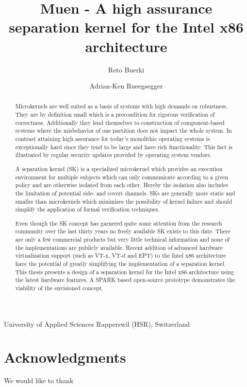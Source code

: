 \documentclass[a4paper,twoside]{report}
\title{Muen - A high assurance separation kernel for the Intel x86 architecture}
\author{Reto Buerki \and Adrian-Ken Rueegsegger}
\begin{document}


\maketitle

University of Applied Sciences Rapperswil (HSR), Switzerland

\begin{abstract}
Microkernels are well suited as a basis of systems with high demands on
robustness. They are by definition small which is a precondition for rigorous
verification of correctness. Additionally they lend themselves to construction
of component-based systems where the misbehavior of one partition does not
impact the whole system. In contrast attaining high assurance for today’s
monolithic operating systems is exceptionally hard since they tend to be large
and have rich functionality. This fact is illustrated by regular security
updates provided by operating system vendors.

A separation kernel (SK) is a specialized microkernel which provides an
execution environment for multiple subjects which can only communicate according
to a given policy and are otherwise isolated from each other. Hereby the
isolation also includes the limitation of potential side- and covert channels.
SKs are generally more static and smaller than microkernels which minimizes the
possibility of kernel failure and should simplify the application of formal
verification techniques.

Even though the SK concept has garnered quite some attention from the research
community over the last thirty years no freely available SK exists to this date.
There are only a few commercial products but very little technical information
and none of the implementations are publicly available. Recent addition of
advanced hardware virtualization support (such as VT-x, VT-d and EPT) to the
Intel x86 architecture have the potential of greatly simplifying the
implementation of a separation kernel. This thesis presents a design of a
separation kernel for the Intel x86 architecture using the latest hardware
features. A SPARK based open-source prototype demonstrates the viability of the
envisioned concept.
\end{abstract}

\section*{Acknowledgments}
We would like to thank

\tableofcontents
\listoffigures
\listoftables
\lstlistoflistings








\printindex{}



\end{document}
